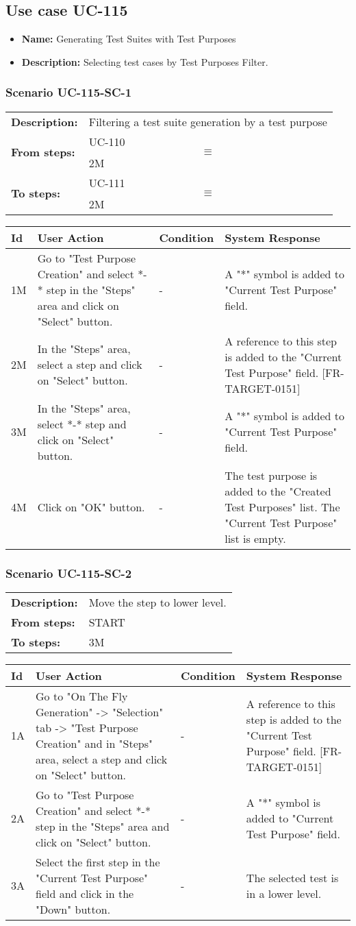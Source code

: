 \documentclass[a4paper,11pt]{article}
\newcommand{\bl}{\\ \hline}
\begin{document}
\subsection*{Use case UC-115}
\begin{itemize}
\item {\bf Name: }Generating Test Suites with Test Purposes
\item {\bf Description: }Selecting test cases by Test Purposes Filter.
\end{itemize}
\subsubsection*{Scenario UC-115-SC-1}
\begin{tabular}{p{1in}p{4in}}
{\bf Description:} & Filtering a test suite generation by a test purpose \\
{\bf From steps:} & UC-110$$\equiv$$2M \\
{\bf To steps:} & UC-111$$\equiv$$2M \\
\end{tabular}
 
\begin{tabular}{|p{0.8in}|p{1.6in}|p{1.6in}|p{1.6in}|}
\hline
Id & User Action & Condition & System Response  \bl 
1M & Go to "Test Purpose Creation" and select *-*  step in the "Steps" area and click on "Select" button. & - & A "*" symbol is added to "Current Test Purpose" field. \bl 
2M & In the "Steps" area, select a step and click on "Select" button. & - & A reference to this step is added to the "Current Test Purpose" field.  [FR-TARGET-0151] \bl 
3M & In the "Steps" area, select *-*  step and click on "Select" button. & - & A "*" symbol is added to "Current Test Purpose" field. \bl 
4M & Click on "OK" button. & - & The test purpose is added to the "Created Test Purposes" list. The "Current Test Purpose" list is empty. \bl 
\end{tabular}
\subsubsection*{Scenario UC-115-SC-2}
\begin{tabular}{p{1in}p{4in}}
{\bf Description:} & Move the step to lower level. \\
{\bf From steps:} & START \\
{\bf To steps:} & 3M \\
\end{tabular}
 
\begin{tabular}{|p{0.8in}|p{1.6in}|p{1.6in}|p{1.6in}|}
\hline
Id & User Action & Condition & System Response  \bl 
1A & Go to "On The Fly Generation" -> "Selection" tab -> "Test Purpose Creation" and in "Steps" area, select a step and click on "Select" button. & - & A reference to this step is added to the "Current Test Purpose" field.  [FR-TARGET-0151] \bl 
2A & Go to "Test Purpose Creation" and select *-*  step in the "Steps" area and click on "Select" button. & - & A "*" symbol is added to "Current Test Purpose" field. \bl 
3A & Select the first step in the "Current Test Purpose" field and click in the "Down" button. & - & The selected test is in a lower level. \bl 
\end{tabular}
\end{document}
